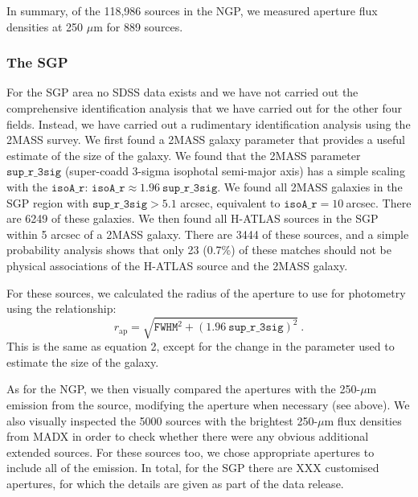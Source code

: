 \documentclass[useAMS,usenatbib]{mnras}
\begin{document}
In summary, of the 118,986 sources in the NGP, we measured aperture
flux densities at 250 $\mu$m for 889 sources. 

\subsubsection{The SGP}

For the SGP area no SDSS data exists and we have not carried out the
comprehensive identification analysis that we have carried out for the
other four fields. Instead, we have carried out a rudimentary
identification analysis using the 2MASS survey. We first found a 2MASS
galaxy parameter that provides a useful estimate of the size of the
galaxy. We found that the 2MASS parameter $\mathtt{sup\_r\_3sig}$
(super-coadd 3-sigma isophotal semi-major axis) has a simple scaling
with the $\mathtt {isoA\_r}$:
$\mathtt{isoA\_r} \approx 1.96 \ \mathtt{sup\_r\_3sig}$.  We found all
2MASS galaxies in the SGP region with $\mathtt{sup\_r\_3sig}>5.1$
arcsec, equivalent to $\mathtt{isoA\_r}=10\ $arcsec. There are 6249 of
these galaxies. We then found all H-ATLAS sources in the SGP within 5
arcsec of a 2MASS galaxy. There are 3444 of these sources, and a
simple probability analysis shows that only 23 (0.7\%) of these
matches should not be physical associations of the H-ATLAS source and
the 2MASS galaxy.

For these sources, we calculated the radius of the aperture
to use for photometry using the relationship:
\smallskip
\begin{equation} 
r_\mathrm{ap} = \sqrt{ \mathtt{FWHM}^2 + {(1.96
    \ \mathtt{sup\_r\_3sig})}^2}\ .
\end{equation}
\smallskip
\noindent This is the same as equation 2, except for the change
in the parameter used to estimate the size of the galaxy. 

As for the NGP, we then visually compared the apertures with the
250-$\mu$m emission from the source, modifying the aperture when
necessary (see above).  We also visually inspected the 5000 sources
with the brightest 250-$\mu$m flux densities from MADX in order to
check whether there were any obvious additional extended sources.  For
these sources too, we chose appropriate apertures to include all of
the emission.  In total, for the SGP there are XXX customised
apertures, for which the details are given as part of the data
release.
\end{document}
